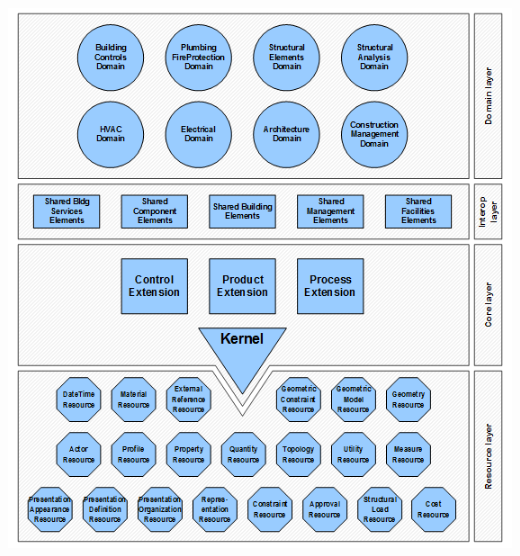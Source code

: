 \documentclass[spanish,10pt,a4paper,final,oneside]{article}
\begin{document}
\includegraphics[width=\textwidth]{IFC4_layered_architecture}
\end{document}
